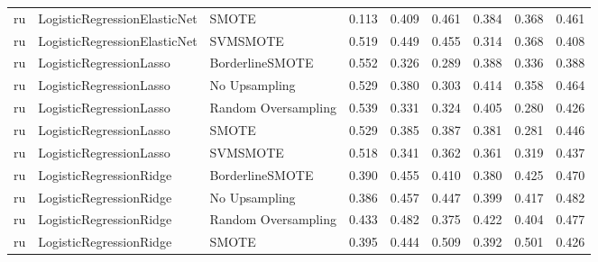 \begin{tabular}{lllllllll}
      ru & LogisticRegressionElasticNet &               SMOTE & 0.113 &                     0.409 &                 0.461 &                  0.384 &                                   0.368 &     0.461 \\
      ru & LogisticRegressionElasticNet &            SVMSMOTE & 0.519 &                     0.449 &                 0.455 &                  0.314 &                                   0.368 &     0.408 \\
      ru &      LogisticRegressionLasso &     BorderlineSMOTE & 0.552 &                     0.326 &                 0.289 &                  0.388 &                                   0.336 &     0.388 \\
      ru &      LogisticRegressionLasso &       No Upsampling & 0.529 &                     0.380 &                 0.303 &                  0.414 &                                   0.358 &     0.464 \\
      ru &      LogisticRegressionLasso & Random Oversampling & 0.539 &                     0.331 &                 0.324 &                  0.405 &                                   0.280 &     0.426 \\
      ru &      LogisticRegressionLasso &               SMOTE & 0.529 &                     0.385 &                 0.387 &                  0.381 &                                   0.281 &     0.446 \\
      ru &      LogisticRegressionLasso &            SVMSMOTE & 0.518 &                     0.341 &                 0.362 &                  0.361 &                                   0.319 &     0.437 \\
      ru &      LogisticRegressionRidge &     BorderlineSMOTE & 0.390 &                     0.455 &                 0.410 &                  0.380 &                                   0.425 &     0.470 \\
      ru &      LogisticRegressionRidge &       No Upsampling & 0.386 &                     0.457 &                 0.447 &                  0.399 &                                   0.417 &     0.482 \\
      ru &      LogisticRegressionRidge & Random Oversampling & 0.433 &                     0.482 &                 0.375 &                  0.422 &                                   0.404 &     0.477 \\
      ru &      LogisticRegressionRidge &               SMOTE & 0.395 &                     0.444 &                 0.509 &                  0.392 &                                   0.501 &     0.426 \\

\end{tabular}
